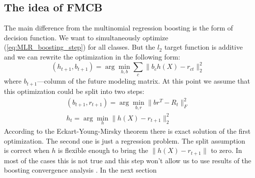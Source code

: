 \documentclass{article}
\begin{document}
\subsection{The idea of FMCB}
The main difference from the multinomial regression boosting is the form of decision function. We want to simultaneously optimize (\ref{eq:MLR_boosting_step}) for all classes. But the $l_2$ target function is additive and we can rewrite the optimization in the following form:
\begin{equation}
(h_{t+1},b_{t+1}) = \arg \min_{h,b} \sum_c \|b_ch(X) - r_{ct}\|_2^2
\end{equation}
where $b_{t+1}$---column of the future modeling matrix. At this point we assume that this optimization could be split into two steps:
\begin{equation}\begin{array}{l}
(b_{t+1},r_{t+1}) = \arg \min_{b,r} \|b r^T - R_t\|_F^2 \\
h_t	= \arg \min_{h} \|h(X) - r_{t+1}\|_2^2
\end{array}\end{equation}
According to the Eckart-Young-Mirsky theorem \cite{Eckart1936} there is exact solution of the first optimization. The second one is just a regression problem. The split assumption is correct when $h$ is flexible enough to bring the $\|h(X) - r_{t+1}\|$ to zero. In most of the cases this is not true and this step won't allow us to use results of the boosting convergence analysis \cite{??}. In the next section
\end{document}
